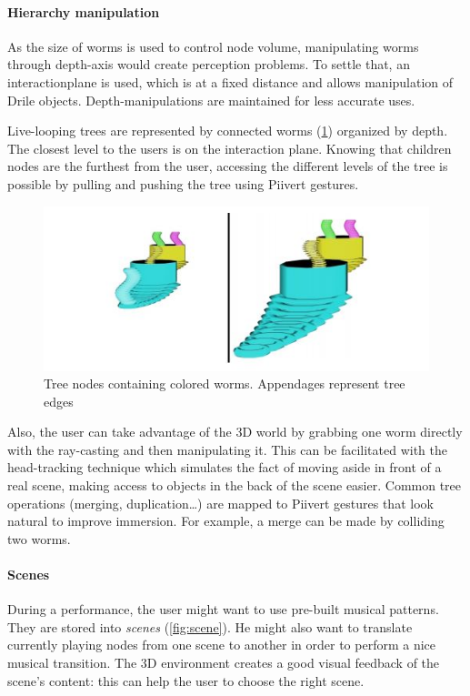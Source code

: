 \paragraph{Hierarchy manipulation}  
As the size of worms is used to control node volume, manipulating worms through depth-axis would create perception problems. To settle that, an \gls{interactionplane} is used, which is at a fixed distance and allows manipulation of Drile objects. Depth-manipulations are maintained for less accurate uses.

Live-looping trees are represented by connected worms (\ref{fig:worm}) organized by depth. The closest level to the users is on the interaction plane.
Knowing that children nodes are the furthest from the user, accessing the different levels of the tree is possible by pulling and pushing the tree using Piivert gestures. 

\begin{figure}[h!]
\centering\includegraphics[scale=0.55]{image/worm.JPG}
\caption{Tree nodes containing colored worms. Appendages represent tree edges}
\label{fig:worm}
\end{figure} 

Also, the user can take advantage of the 3D world by grabbing one worm directly with the ray-casting and then manipulating it. This can be facilitated with the head-tracking technique which simulates the fact of moving aside in front of a real scene, making access to objects in the back of the scene easier. 
Common tree operations (merging, duplication\dots ) are mapped to Piivert gestures that look natural to improve immersion. For example, a merge can be made by colliding two worms.

\paragraph{Scenes}  
During a performance, the user might want to use pre-built musical patterns. They are stored into \textit{scenes} (\ref{fig:scene}). He might also want to translate currently playing nodes from one scene to another in order to perform a nice musical transition. The 3D environment creates a good visual feedback of the scene's content: this can help the user to choose the right scene.

